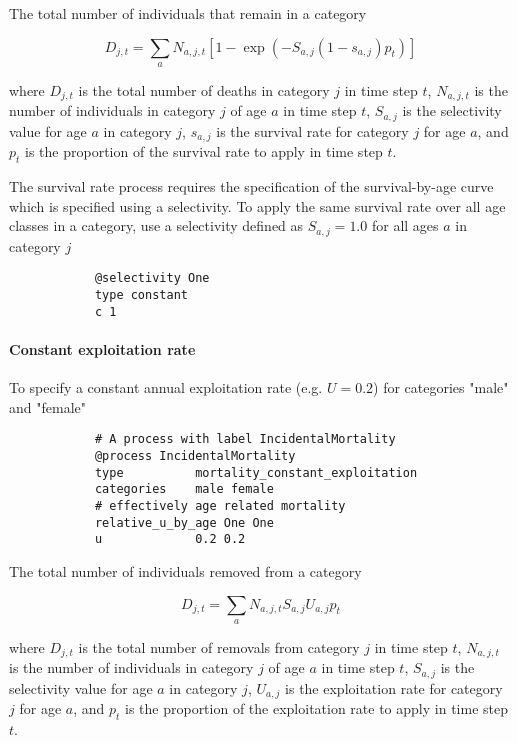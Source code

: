 The total number of individuals that remain in a category

\begin{equation}
	D_{j,t} = \sum_a N_{a,j,t} [1 - \exp(-S_{a,j} (1-s_{a,j}) p_t)]
\end{equation}

where $D_{j,t}$ is the total number of deaths in category $j$ in time step $t$, $N_{a,j,t}$ is the number of individuals in category $j$ of age $a$ in time step $t$, $S_{a,j}$ is the selectivity value for age $a$ in category $j$, $s_{a,j}$ is the survival rate for category $j$ for age $a$, and $p_t$ is the proportion of the survival rate to apply in time step $t$.

The survival rate process requires the specification of the survival-by-age curve which is specified using a selectivity. To apply the same survival rate over all age classes in a category, use a selectivity defined as $S_{a,j}=1.0$ for all ages $a$ in category $j$

{\small{\begin{verbatim}
			@selectivity One
			type constant
			c 1
\end{verbatim}}}

\paragraph{Constant exploitation rate}\label{sec:Process-MortalityConstantExploitation} 

To specify a constant annual exploitation rate (e.g. $U=0.2$) for categories "male" and "female"

{\small{\begin{verbatim}
			# A process with label IncidentalMortality
			@process IncidentalMortality
			type          mortality_constant_exploitation
			categories    male female
			# effectively age related mortality
			relative_u_by_age One One
			u             0.2 0.2
\end{verbatim}}}

The total number of individuals removed from a category

\begin{equation}
	D_{j,t} = \sum_a N_{a,j,t} S_{a,j} U_{a,j} p_t
\end{equation}

where $D_{j,t}$ is the total number of removals from category $j$ in time step $t$, $N_{a,j,t}$ is the number of individuals in category $j$ of age $a$ in time step $t$, $S_{a,j}$ is the selectivity value for age $a$ in category $j$, $U_{a,j}$ is the exploitation rate for category $j$ for age $a$, and $p_t$ is the proportion of the exploitation rate to apply in time step $t$.

